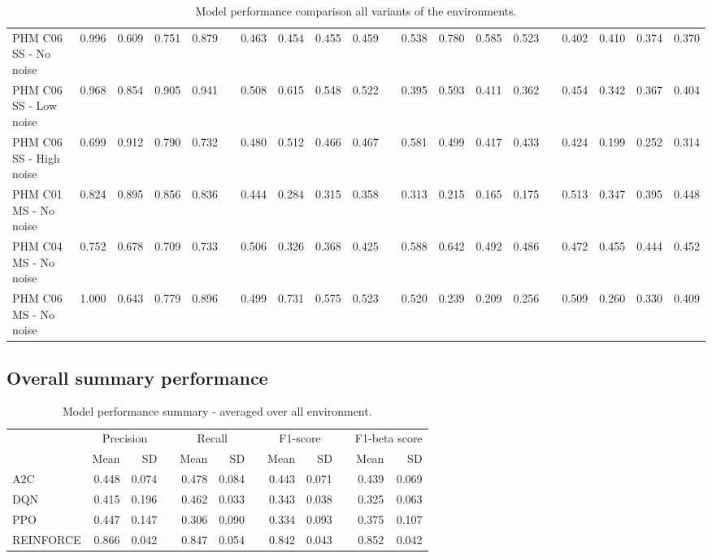 \documentclass[a4paper, 12pt]{article}
\newcommand{\rowspace}[1]{\renewcommand{\arraystretch}{#1}}
\begin{document}
\begin{landscape}
\begin{table}
\begin{tabular}{@{}l rrrr c rrrr c rrrr c rrrr@{}}
			PHM C06 SS - No noise &0.996 &0.609 &0.751 & 0.879 & & 0.463 &0.454 &0.455 &0.459 & &0.538 &0.780 &0.585 &0.523 & &0.402 &0.410 &0.374&0.370\\
			PHM C06 SS - Low noise &0.968 &0.854 &0.905 & 0.941 & & 0.508 &0.615 &0.548 &0.522 & &0.395 &0.593 &0.411 &0.362 & &0.454 &0.342 &0.367&0.404\\
			PHM C06 SS - High noise &0.699 &0.912 &0.790 & 0.732 & & 0.480 &0.512 &0.466 &0.467 & &0.581 &0.499 &0.417 &0.433 & &0.424 &0.199 &0.252&0.314\\ \midrule
			
			PHM C01 MS - No noise &0.824 &0.895 &0.856 & 0.836 & & 0.444 &0.284 &0.315 &0.358 & &0.313 &0.215 &0.165 &0.175 & &0.513 &0.347 &0.395&0.448\\
			PHM C04 MS - No noise &0.752 &0.678 &0.709 & 0.733 & & 0.506 &0.326 &0.368 &0.425 & &0.588 &0.642 &0.492 &0.486 & &0.472 &0.455 &0.444&0.452\\
			PHM C06 MS - No noise &1.000 &0.643 &0.779 & 0.896 & & 0.499 &0.731 &0.575 &0.523 & &0.520 &0.239 &0.209 &0.256 & &0.509 &0.260 &0.330&0.409\\
					
			\bottomrule
		\end{tabular}
		\caption{Model performance comparison all variants of the environments.}
		\label{tbl:DetailedMetrics}
	\end{table}
\end{landscape}
\restoregeometry %

\subsection{Overall summary performance}
\begin{table}[hbt!]\centering
	\sffamily
	\rowspace{1.3}
	\begin{tabular}{@{}l rr c rr c rr c rr@{}}
		\arrayrulecolor{black!40}\toprule
		& \multicolumn{2}{c}{Precision} & \phantom{i} & \multicolumn{2}{c}{Recall} & \phantom{i} & \multicolumn{2}{c}{F1-score} & \phantom{i} & \multicolumn{2}{c}{F1-beta score} \\
		\cmidrule{2-3} \cmidrule{5-6} \cmidrule{8-9} \cmidrule{11-12} 
		
		&Mean &SD & &Mean &SD & &Mean &SD& &Mean & SD\\ \midrule
		A2C & 0.448 & 0.074 & &0.478 & 0.084 & & 0.443 & 0.071 & &0.439 &0.069 \\
		DQN & 0.415 & 0.196 & &0.462 & 0.033 & & 0.343 & 0.038 & &0.325 &0.063 \\
		PPO & 0.447 & 0.147 & &0.306 & 0.090 & & 0.334 & 0.093 & &0.375 &0.107 \\
		REINFORCE & 0.866 & 0.042 & &0.847 & 0.054 & & 0.842 & 0.043 & &0.852 &0.042 \\	
		\bottomrule
	\end{tabular}
	\caption{Model performance summary - averaged over all environment.}
	\label{tbl:OverallSummary}
\end{table}
\end{document}
